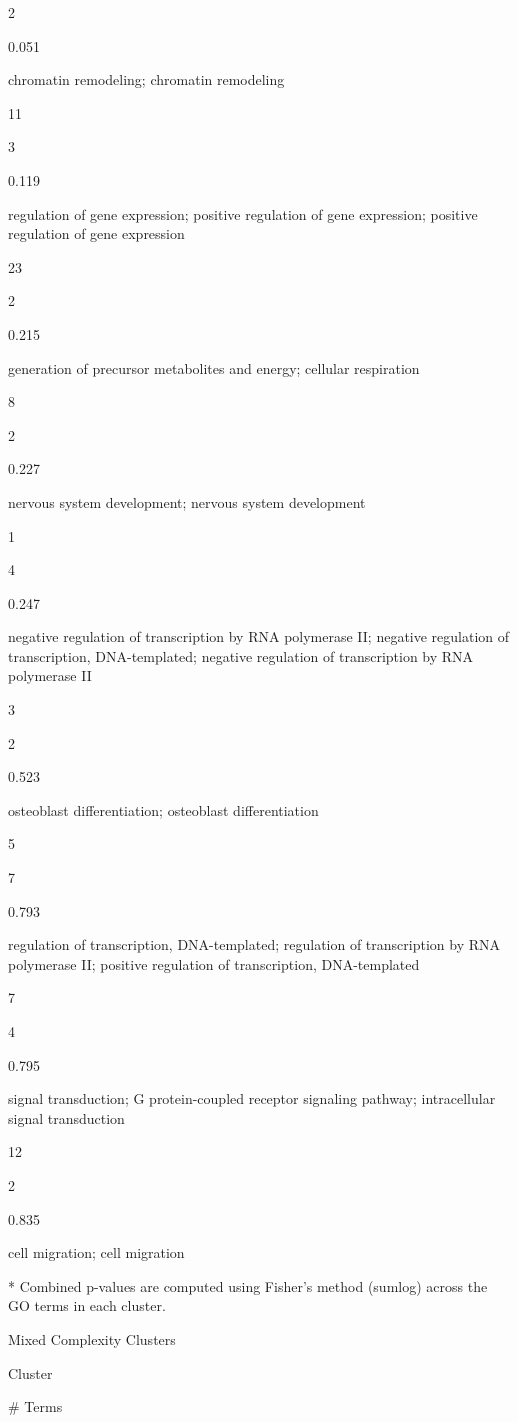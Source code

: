 \documentclass[
  letterpaper,
  DIV=11,
  numbers=noendperiod,
  openany,
  oneside]{scrreprt}
\begin{document}
2

0.051

chromatin remodeling; chromatin remodeling

11

3

0.119

regulation of gene expression; positive regulation of gene expression;
positive regulation of gene expression

23

2

0.215

generation of precursor metabolites and energy; cellular respiration

8

2

0.227

nervous system development; nervous system development

1

4

0.247

negative regulation of transcription by RNA polymerase II; negative
regulation of transcription, DNA-templated; negative regulation of
transcription by RNA polymerase II

3

2

0.523

osteoblast differentiation; osteoblast differentiation

5

7

0.793

regulation of transcription, DNA-templated; regulation of transcription
by RNA polymerase II; positive regulation of transcription,
DNA-templated

7

4

0.795

signal transduction; G protein-coupled receptor signaling pathway;
intracellular signal transduction

12

2

0.835

cell migration; cell migration

* Combined p-values are computed using Fisher's method (sumlog) across
the GO terms in each cluster.

Mixed Complexity Clusters

Cluster

\# Terms
\end{document}
